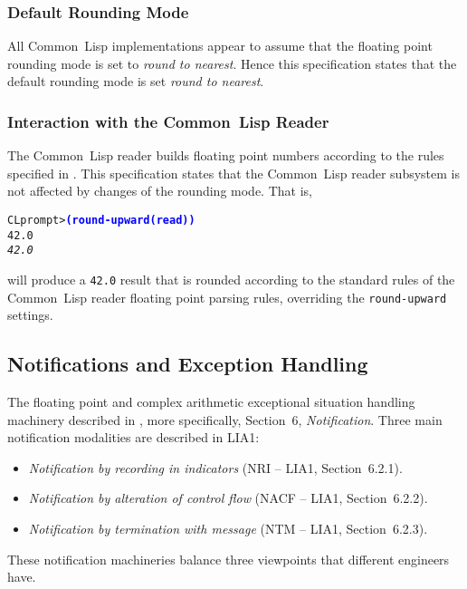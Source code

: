 \documentclass[10pt,fleqn]{article}
\newcommand{\CL}{\textsf{Common~Lisp}}
\newcommand{\code}[1]{\texttt{#1}}
\newcommand{\codeprompt}[1]{\textcolor{blue}{\textbf{#1}}}
\begin{document}
\subsubsection{Default Rounding Mode}

All \CL{} implementations appear to assume that the floating point
rounding mode is set to \emph{round to nearest}.  Hence this
specification states that the default rounding mode is set \emph{round
  to nearest}.

\subsubsection{Interaction with the \CL{} Reader}

The \CL{} reader builds floating point numbers according to the rules
specified in \cite{1994:ANSICL}.  This specification states that the
\CL{} reader subsystem is not affected by changes of the rounding
mode.  That is,
\begin{alltt}
CL prompt> \codeprompt{(round-upward (read))}
42.0
\textit{42.0}
\end{alltt}
will produce a \code{42.0} result that is rounded according to the
standard rules of the \CL{} reader floating point parsing
rules, overriding the \code{round-upward} settings.



\subsection{Notifications and Exception Handling}
\label{sect:notifications}

The floating point and complex arithmetic exceptional situation
handling machinery described in
\cite{2012:LIA1,2001:LIA2,2004:LIA3,2008:IEEE-754}, more specifically,
\cite{2012:LIA1} Section~6, \emph{Notification}.  Three main
notification modalities are described in LIA1:
\begin{itemize}
\item \emph{Notification by recording in indicators} (NRI -- LIA1,
  Section~6.2.1).
\item \emph{Notification by alteration of control flow} (NACF -- LIA1,
  Section~6.2.2).
\item \emph{Notification by termination with message} (NTM -- LIA1,
  Section~6.2.3).
\end{itemize}

\noindent
These notification machineries balance three viewpoints that different
engineers have.
\end{document}
